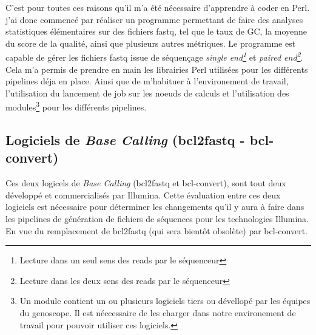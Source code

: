 C'est pour toutes ces raisons qu'il m'a été nécessaire d'apprendre à coder en Perl. j'ai donc commencé par réaliser un programme permettant de faire des analyses statistiques élémentaires sur des fichiers fastq, tel que le taux de GC, la moyenne du score de la qualité, ainsi que plusieurs autres métriques. Le programme est capable de gérer les fichiers fastq issue de séquençage \emph{single end\footnote{Lecture dans un seul sens des reads par le séquenceur}} et \emph{paired end\footnote{Lecture dans les deux sens des reads par le séquenceur}}. Cela m'a permis de prendre en main les librairies Perl utilisées pour les différents pipelines déja en place. Ainsi que de m'habituer à l'environement de travail, l'utilisation du lancement de job sur les noeuds de calculs et l'utilisation des modules\footnote{Un module contient un ou plusieurs logiciels tiers ou dévellopé par les équipes du genoscope. Il est néccessaire de les charger dans notre environement de travail pour pouvoir utiliser ces logiciels.} pour les différents pipelines.

\subsection{Logiciels de \emph{Base Calling} (bcl2fastq - bcl-convert)}
Ces deux logicels de \emph{Base Calling} (bcl2fastq et bcl-convert), sont tout deux développé et commercialisés par Illumina. Cette évaluation entre ces deux logiciels est nécessaire pour déterminer les changements qu'il y aura à faire dans les pipelines de génération de fichiers de séquences pour les technologies Illumina. En vue du remplacement de bcl2fastq (qui sera bientôt obsolète) par bcl-convert.

